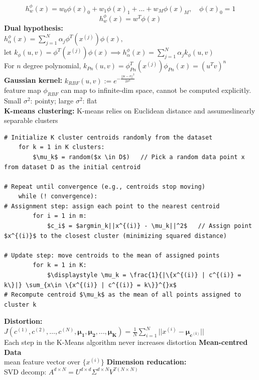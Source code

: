 \documentclass[8pt,twocolumn]{article}
\begin{document}
\[h^{\phi}_w(x) = w_0\phi(x)_0 + w_1\phi(x)_1 + ... + w_M\phi(x)_M,\quad \phi(x)_0 = 1\]
\[h^{\phi}_w(x) = w^T\phi(x)\]
\textbf{Dual hypothesis:}\\
$h^{\phi}_\alpha(x) = \sum_{j=1}^{N}\alpha_j \phi^T(x^{(j)})\phi(x),$
$\text{let } k_\phi(u, v) = \phi^T(x^{(j)})\phi(x) \implies h^{\phi}_\alpha(x) = \sum_{j=1}^{N}\alpha_j k_\phi(u, v)$\\
For $n$ degree polynomial, $k_{Pn}(u, v) = \phi_{Pn}^T(x^{(j)})\phi_{Pn}(x) = (u^Tv)^n$\\
\textbf{Gaussian kernel:} $k_{RBF}(u, v):= e^{-\frac{||u-v||^2}{2\sigma^2}}$\\
feature map $\phi_{RBF}$ can map to infinite-dim space, cannot be computed explicitly. \\
Small $\sigma^2$: pointy; large $\sigma^2$: flat\\
\textbf{K-means clustering:} K-means relies on Euclidean distance and assumeslinearly separable clusters
\begin{lstlisting}[mathescape = true]
# Initialize K cluster centroids randomly from the dataset
    for k = 1 in K clusters:
        $\mu_k$ = random($x \in D$)   // Pick a random data point x from dataset D as the initial centroid
    
# Repeat until convergence (e.g., centroids stop moving)
    while (! convergence):
# Assignment step: assign each point to the nearest centroid
        for i = 1 in m:
            $c_i$ = $argmin_k||x^{(i)} - \mu_k||^2$   // Assign point $x^{(i)}$ to the closest cluster (minimizing squared distance)
    
# Update step: move centroids to the mean of assigned points
        for k = 1 in K:
            $\displaystyle \mu_k = \frac{1}{|\{x^{(i)} | c^{(i)} = k\}|} \sum_{x\in \{x^{(i)} | c^{(i)} = k\}}^{}x$  
# Recompute centroid $\mu_k$ as the mean of all points assigned to cluster k
    \end{lstlisting}
\textbf{Distortion:}\\
$J(c^{(1)}, c^{(2)}, \dots, c^{(N)}, \boldsymbol{\mu_1}, \boldsymbol{\mu_2}, ..., \boldsymbol{\mu_K}) = \frac{1}{N}\sum_{i=1}^{N}||x^{(i)} - \boldsymbol{\mu_{c^{(i)}}}||$\\
Each step in the K-Means algorithm never increases distortion
\textbf{Mean-centred Data}\\
mean feature vector over $\{x^{(i)}\}$
\textbf{Dimension reducation:}\\
SVD decomp: $A^{d \times N} = U^{d \times d}\Sigma^{d \times N} V^{T {(N \times N)}}$
\end{document}
